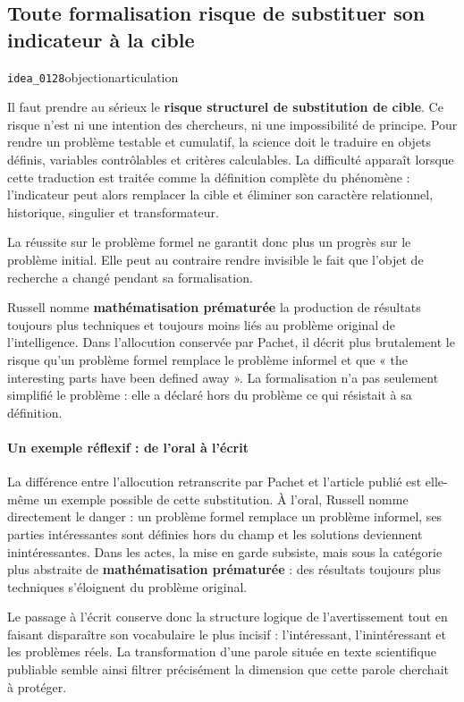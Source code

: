 \documentclass[10pt,a4paper]{article}
\begin{document}
\subsection{Toute formalisation risque de substituer son indicateur à la cible}
{\small\color{metadata} \texttt{idea\_0128}\quad\textbullet\quad objection\quad\textbullet\quad articulation\par}

Il faut prendre au sérieux le \textbf{risque structurel de substitution de cible}. Ce risque n'est ni une intention des chercheurs, ni une impossibilité de principe. Pour rendre un problème testable et cumulatif, la science doit le traduire en objets définis, variables contrôlables et critères calculables. La difficulté apparaît lorsque cette traduction est traitée comme la définition complète du phénomène : l'indicateur peut alors remplacer la cible et éliminer son caractère relationnel, historique, singulier et transformateur.

La réussite sur le problème formel ne garantit donc plus un progrès sur le problème initial. Elle peut au contraire rendre invisible le fait que l'objet de recherche a changé pendant sa formalisation.

Russell nomme \textbf{mathématisation prématurée} la production de résultats toujours plus techniques et toujours moins liés au problème original de l'intelligence. Dans l'allocution conservée par Pachet, il décrit plus brutalement le risque qu'un problème formel remplace le problème informel et que « the interesting parts have been defined away ». La formalisation n'a pas seulement simplifié le problème : elle a déclaré hors du problème ce qui résistait à sa définition.

\paragraph{Un exemple réflexif : de l'oral à l'écrit}
La différence entre l'allocution retranscrite par Pachet et l'article publié est elle-même un exemple possible de cette substitution. À l'oral, Russell nomme directement le danger : un problème formel remplace un problème informel, ses parties intéressantes sont définies hors du champ et les solutions deviennent inintéressantes. Dans les actes, la mise en garde subsiste, mais sous la catégorie plus abstraite de \textbf{mathématisation prématurée} : des résultats toujours plus techniques s'éloignent du problème original.

Le passage à l'écrit conserve donc la structure logique de l'avertissement tout en faisant disparaître son vocabulaire le plus incisif : l'intéressant, l'inintéressant et les problèmes réels. La transformation d'une parole située en texte scientifique publiable semble ainsi filtrer précisément la dimension que cette parole cherchait à protéger.
\end{document}

